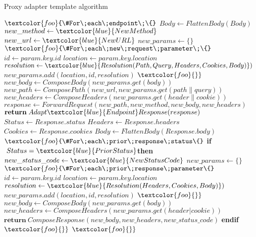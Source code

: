 \begin{algorithm}
    \caption{Proxy adapter template algorithm}\label{alg:adapteraldg}
    \begin{algorithmic}[1]
        \State $\textcolor{foo}{\#For\;each\;endpoint\;\{}$
            \State $Body \leftarrow FlattenBody(Body)$
            \State $new\_method  \leftarrow \textcolor{blue}{NewMethod}$
            \State $new\_url  \leftarrow \textcolor{blue}{NewURL}$
            \State $new\_params  \leftarrow \{\}$
            \State $\textcolor{foo}{\#For\;each\;new\;request\;parameter\;\{}$
            \State \;\;\;\;$id \leftarrow param.key.id$
            \State \;\;\;\;$location \leftarrow param.key.location$
            \State \;\;\;\;$resolution \leftarrow \textcolor{blue}{Resolution(Path, Query, Headers, Cookies, Body)})$
            \State \;\;\;\;$new\_params.add(location,id,resolution)$
            \State $\textcolor{foo}{\}}$
            \State $new\_body  \leftarrow ComposeBody(new\_params.get(body))$
            \State $new\_path  \leftarrow ComposePath(new\_url, new\_params.get(path\|query))$
            \State $new\_headers  \leftarrow ComposeHeaders(new\_params.get(header\|cookie))$
            \State $response \leftarrow ForwardRequest(new\_path, new\_method, new\_body, new\_headers)$
            \State $\textbf{return}\;Adapt\textcolor{blue}{Endpoint}Response(response)$
        \EndProcedure
        \Statex
            \State $Status \leftarrow Response.status$
            \State $Headers \leftarrow Response.headers$
            \State $Cookies \leftarrow Response.cookies$
            \State $Body \leftarrow FlattenBody(Response.body)$
            \State $\textcolor{foo}{\#For\;each\;prior\;response\;status\{}$
            \State \;\;\;\;\textbf{if}$\;Status = \textcolor{blue}{PriorStatus}$\;\textbf{then}
            \State \;\;\;\;\;\;\;\;$new\_status\_code  \leftarrow \textcolor{blue}{NewStatusCode}$
            \State \;\;\;\;\;\;\;\;$new\_params  \leftarrow \{\}$
            \State \;\;\;\;\;\;\;\;$\textcolor{foo}{\#For\;each\;prior\;response\;parameter\{}$
            \State \;\;\;\;\;\;\;\;\;\;\;\;$id \leftarrow param.key.id$
            \State \;\;\;\;\;\;\;\;\;\;\;\;$location \leftarrow param.key.location$
            \State \;\;\;\;\;\;\;\;\;\;\;\;$resolution \leftarrow \textcolor{blue}{Resolution(Headers, Cookies, Body)})$
            \State \;\;\;\;\;\;\;\;\;\;\;\;$new\_params.add(location,id,resolution)$
            \State \;\;\;\;\;\;\;\;$\textcolor{foo}{\}}$
            \State \;\;\;\;\;\;\;\;$new\_body  \leftarrow ComposeBody(new\_params.get(body))$
            \State \;\;\;\;\;\;\;\;$new\_headers  \leftarrow ComposeHeaders(new\_params.get(header|cookie))$
            \State \;\;\;\;\;\;\;\;$\textbf{return}\ ComposeResponse(new\_body, new\_headers, new\_status\_code)$
            \State \;\;\;\;\textbf{end\;if}
            \State $\textcolor{foo}{\}}$
        \EndProcedure
        \State $\textcolor{foo}{\}}$
    \end{algorithmic}
\end{algorithm}


